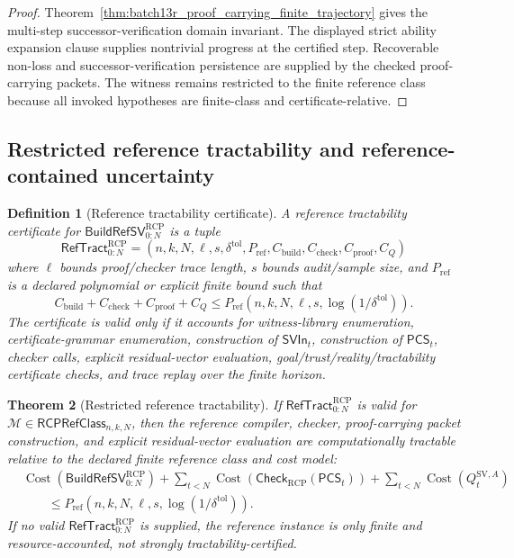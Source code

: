 \documentclass[11pt]{article}
\newtheorem{theorem}{Theorem}[section]
\newtheorem{definition}[theorem]{Definition}
\newcommand{\1}{\mathbf{1}}
\newcommand{\RCP}{\mathrm{RCP}}
\providecommand{\Cost}{\operatorname{Cost}}
\begin{document}
\begin{proof}
Theorem~\ref{thm:batch13r_proof_carrying_finite_trajectory} gives the multi-step successor-verification domain invariant.  The displayed strict ability expansion clause supplies nontrivial progress at the certified step.  Recoverable non-loss and successor-verification persistence are supplied by the checked proof-carrying packets.  The witness remains restricted to the finite reference class because all invoked hypotheses are finite-class and certificate-relative.
\end{proof}

\subsection{Restricted reference tractability and reference-contained uncertainty}

\begin{definition}[Reference tractability certificate]
\label{def:batch13r_reference_tractability_certificate}
A reference tractability certificate for \(\mathsf{BuildRefSV}_{0:N}^{\RCP}\) is a tuple
\[
\mathsf{RefTract}_{0:N}^{\RCP}
=(n,k,N,\ell,s,\delta^{\mathrm{tol}},P_{\mathrm{ref}},C_{\mathrm{build}},C_{\mathrm{check}},C_{\mathrm{proof}},C_Q)
\]
where \(\ell\) bounds proof/checker trace length, \(s\) bounds audit/sample size, and \(P_{\mathrm{ref}}\) is a declared polynomial or explicit finite bound such that
\[
C_{\mathrm{build}}+C_{\mathrm{check}}+C_{\mathrm{proof}}+C_Q
\le
P_{\mathrm{ref}}(n,k,N,\ell,s,\log(1/\delta^{\mathrm{tol}})).
\]
The certificate is valid only if it accounts for witness-library enumeration, certificate-grammar enumeration, construction of \(\mathsf{SVIn}_t\), construction of \(\mathsf{PCS}_t\), checker calls, explicit residual-vector evaluation, goal/trust/reality/tractability certificate checks, and trace replay over the finite horizon.
\end{definition}

\begin{theorem}[Restricted reference tractability]
\label{thm:batch13r_restricted_reference_tractability}
If \(\mathsf{RefTract}_{0:N}^{\RCP}\) is valid for \(\mathcal M\in\mathsf{RCPRefClass}_{n,k,N}\), then the reference compiler, checker, proof-carrying packet construction, and explicit residual-vector evaluation are computationally tractable relative to the declared finite reference class and cost model:
\[
\begin{aligned}
&\Cost(\mathsf{BuildRefSV}_{0:N}^{\RCP})
+
\sum_{t<N}\Cost(\mathsf{Check}_{\RCP}(\mathsf{PCS}_t))
+
\sum_{t<N}\Cost(Q_t^{\mathrm{SV},A})\\
&\qquad\le
P_{\mathrm{ref}}(n,k,N,\ell,s,\log(1/\delta^{\mathrm{tol}})).
\end{aligned}
\]
If no valid \(\mathsf{RefTract}_{0:N}^{\RCP}\) is supplied, the reference instance is only finite and resource-accounted, not strongly tractability-certified.
\end{theorem}
\end{document}
